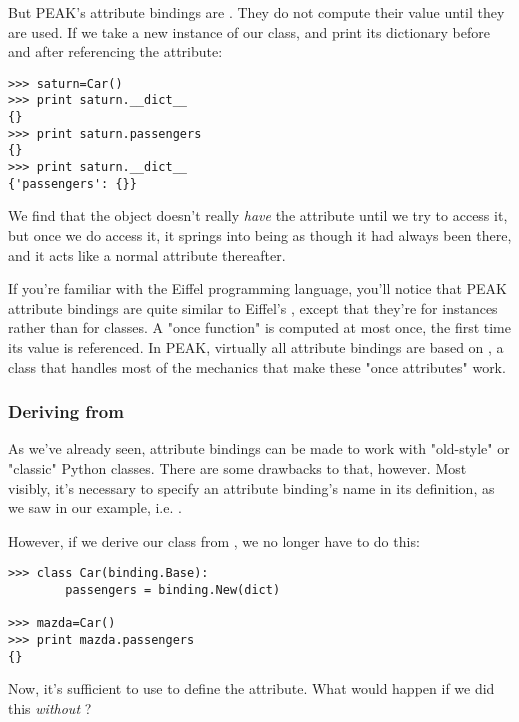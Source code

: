 But PEAK's attribute bindings are .  They do not compute their
value until they are used.  If we take a new instance of our 
class, and print its dictionary before and after referencing the 
 attribute:

\begin{verbatim}
>>> saturn=Car()
>>> print saturn.__dict__
{}
>>> print saturn.passengers
{}
>>> print saturn.__dict__
{'passengers': {}}

\end{verbatim}

We find that the object doesn't really \emph{have} the attribute until we
try to access it, but once we do access it, it springs into being as though
it had always been there, and it acts like a normal attribute thereafter.


If you're familiar with the Eiffel programming language, you'll notice that
PEAK attribute bindings are quite similar to Eiffel's ,
except that they're for instances rather than for classes.  A "once function"
is computed at most once, the first time its value is referenced.  In PEAK,
virtually all attribute bindings are based on , a class
that handles most of the mechanics that make these "once attributes" work.

\subsubsection{Deriving from }

As we've already seen, attribute bindings can be made to work with 
"old-style" or "classic" Python classes.  There are some drawbacks to that,
however.  Most visibly, it's necessary to specify an attribute binding's
name in its definition, as we saw in our example, i.e. 
.

However, if we derive our class from , we no longer have
to do this:

\begin{verbatim}
>>> class Car(binding.Base):
        passengers = binding.New(dict)
	
>>> mazda=Car()
>>> print mazda.passengers
{}

\end{verbatim}

Now, it's sufficient to use  to define the attribute.
What would happen if we did this \emph{without} ?











